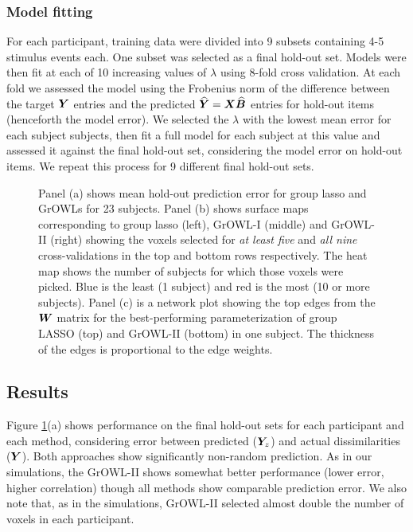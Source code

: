 \subsubsection*{Model fitting}
For each participant, training data were divided into 9 subsets containing 4-5 stimulus
events each. One subset was selected as a final hold-out set. Models were then fit at each
of 10 increasing values of $\lambda$ using 8-fold cross validation. At each fold we
assessed the model using the Frobenius norm of the difference between the target $\boldsymbol{Y}$
entries and the predicted $\boldsymbol{\widehat{Y}} = \boldsymbol{X}\widehat{\boldsymbol{B}}$ entries for hold-out items (henceforth
the model error). We selected the $\lambda$ with the lowest mean error for each subject
subjects, then fit a full model for each subject at this value and assessed it against the
final hold-out set, considering the model error on hold-out items. We repeat this process
for 9 different final hold-out sets.



\begin{figure*}[!h]
\centering
{}
\hfil
{}
\hfill
{}
\caption{Panel (a) shows mean hold-out prediction error for group lasso and GrOWLs for 23 subjects. Panel (b) shows surface maps corresponding to group lasso (left), GrOWL-I (middle) and GrOWL-II (right) showing the voxels selected for \textit{at least five} and \textit{all nine} cross-validations in the top and bottom rows respectively. The heat map shows the number of subjects for which those voxels were picked. Blue is the least (1 subject) and red is the most (10 or more subjects). Panel (c) is a network plot showing the top edges from the $\boldsymbol{W}$ matrix for the best-performing parameterization of group LASSO (top) and GrOWL-II (bottom) in one subject. The thickness of the edges is proportional to the edge weights.}
\label{fig.error}
\end{figure*}

\subsection{Results}

Figure \ref{fig.error}(a) shows performance on the final hold-out sets for each
participant and each method, considering error between predicted ($\boldsymbol{Y}_z$) and actual
dissimilarities ($\boldsymbol{Y}$). Both approaches show significantly non-random prediction. As in
our simulations, the GrOWL-II shows somewhat better performance (lower error, higher
correlation) though all methods show comparable prediction error. We also note that, as in
the simulations, GrOWL-II selected almost double the number of voxels in each participant. 

